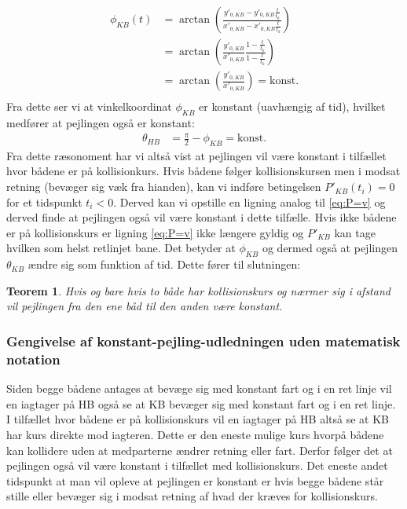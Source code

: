 \documentclass[%
 reprint,
nofootinbib,
aps,
]{revtex4-1}
\newtheorem{theorem}{Teorem}
\begin{document}
\begin{align*}
  \phi_{KB}(t) &= \arctan{\left( \frac{y'_{0,KB} - y'_{0,KB}\frac{t}{t_k}}{x'_{0,KB} - x'_{0,KB}\frac{t}{t_k}}\right)} \\
  &= \arctan{\left(\frac{y'_{0,KB}}{x'_{0,KB}} \frac{1 - \frac{t}{t_k}}{1 - \frac{t}{t_k}}\right)} \\
  &= \arctan{\left(\frac{y'_{0,KB}}{x'_{0,KB}}\right)} = \text{konst.} \\
\end{align*}
Fra dette ser vi at vinkelkoordinat $\phi_{KB}$ er konstant (uavhængig af tid), hvilket medfører at pejlingen også er konstant:
\begin{align*}
  \theta_{HB} &= \frac{\pi}{2} - \phi_{KB} = \text{konst.}
\end{align*}
Fra dette ræsonoment har vi altså vist at pejlingen vil være konstant i tilfællet hvor bådene er på kollisionkurs. Hvis bådene følger kollisionskursen men i modsat retning (bevæger sig væk fra hianden), kan vi indføre betingelsen $P'_{KB}(t_i) = 0$ for et tidspunkt $t_i < 0$. Derved kan vi opstille en ligning analog til \ref{eq:P=v} og derved finde at pejlingen også vil være konstant i dette tilfælle. Hvis ikke bådene er på kollisionskurs er ligning \ref{eq:P=v} ikke længere gyldig og $P'_{KB}$ kan tage hvilken som helst retlinjet bane. Det betyder at $\phi_{KB}$ og dermed også at pejlingen $\theta_{KB}$ ændre sig som funktion af tid. Dette fører til slutningen:
\begin{theorem}
  Hvis og bare hvis to både har kollisionskurs og nærmer sig i afstand vil pejlingen fra den ene båd til den anden være konstant.
  \label{Teo:pejling}
\end{theorem}
\subsubsection{Gengivelse af konstant-pejling-udledningen uden matematisk notation}
Siden begge bådene antages at bevæge sig med konstant fart og i en ret linje vil en iagtager på HB også se at KB bevæger sig med konstant fart og i en ret linje. I tilfællet hvor bådene er på kollisionskurs vil en iagtager på HB altså se at KB har kurs direkte mod iagteren. Dette er den eneste mulige kurs hvorpå bådene kan kollidere uden at medparterne ændrer retning eller fart. Derfor følger det at pejlingen også vil være konstant i tilfællet med kollisionskurs. Det eneste andet tidspunkt at man vil opleve at pejlingen er konstant er hvis begge bådene står stille eller bevæger sig i modsat retning af hvad der kræves for kollisionskurs.
\end{document}
